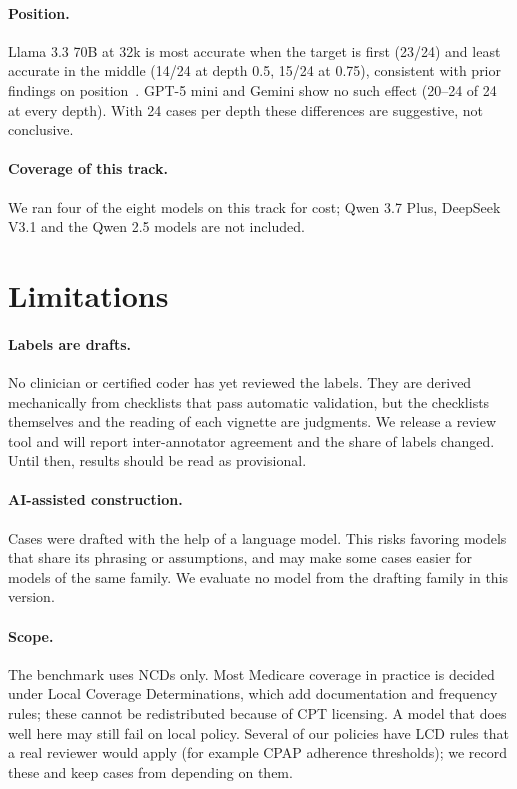 \documentclass[11pt]{article}
\begin{document}
\paragraph{Position.} Llama 3.3 70B at 32k is most accurate when the target is first (23/24) and
least accurate in the middle (14/24 at depth 0.5, 15/24 at 0.75), consistent with prior findings on
position~\citep{liu2024lost}. GPT-5 mini and Gemini show no such effect (20--24 of 24 at every
depth). With 24 cases per depth these differences are suggestive, not conclusive.

\paragraph{Coverage of this track.} We ran four of the eight models on this track for cost; Qwen 3.7
Plus, DeepSeek V3.1 and the Qwen 2.5 models are not included.

\section{Limitations}
\label{sec:limits}

\paragraph{Labels are drafts.} No clinician or certified coder has yet reviewed the labels. They
are derived mechanically from checklists that pass automatic validation, but the checklists
themselves and the reading of each vignette are judgments. We release a review tool and will
report inter-annotator agreement and the share of labels changed. Until then, results should be
read as provisional.

\paragraph{AI-assisted construction.} Cases were drafted with the help of a language model. This
risks favoring models that share its phrasing or assumptions, and may make some cases easier for
models of the same family. We evaluate no model from the drafting family in this version.

\paragraph{Scope.} The benchmark uses NCDs only. Most Medicare coverage in practice is decided
under Local Coverage Determinations, which add documentation and frequency rules; these cannot be
redistributed because of CPT licensing. A model that does well here may still fail on local
policy. Several of our policies have LCD rules that a real reviewer would apply (for example CPAP
adherence thresholds); we record these and keep cases from depending on them.
\end{document}
